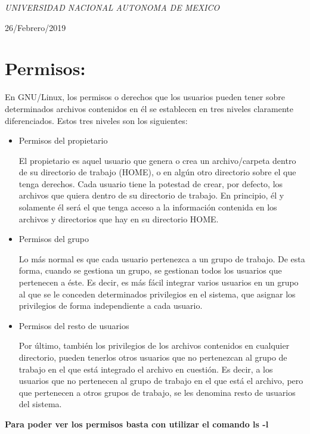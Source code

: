 \documentclass[a4paper, 11pt, oneside]{article}
\begin{document}
\begin{titlepage}
	\textit{UNIVERSIDAD NACIONAL AUTONOMA DE MEXICO} 
	
	\vfill
	
	
	
	
	\vspace{0.3\baselineskip} 
	
	26/Febrero/2019 

\end{titlepage}

\section*{Permisos:}

En GNU/Linux, los permisos o derechos que los usuarios pueden tener sobre determinados archivos contenidos en él se establecen en tres niveles claramente diferenciados. Estos tres niveles son los siguientes:
\begin{itemize}
    \item Permisos del propietario

El propietario es aquel usuario que genera o crea un archivo/carpeta dentro de su directorio de trabajo (HOME), o en algún otro directorio sobre el que tenga derechos. Cada usuario tiene la potestad de crear, por defecto, los archivos que quiera dentro de su directorio de trabajo. En principio, él y solamente él será el que tenga acceso a la información contenida en los archivos y directorios que hay en su directorio HOME.

\item Permisos del grupo

Lo más normal es que cada usuario pertenezca a un grupo de trabajo. De esta forma, cuando se gestiona un grupo, se gestionan todos los usuarios que pertenecen a éste. Es decir, es más fácil integrar varios usuarios en un grupo al que se le conceden determinados privilegios en el sistema, que asignar los privilegios de forma independiente a cada usuario.

\item Permisos del resto de usuarios

Por último, también los privilegios de los archivos contenidos en cualquier directorio, pueden tenerlos otros usuarios que no pertenezcan al grupo de trabajo en el que está integrado el archivo en cuestión. Es decir, a los usuarios que no pertenecen al grupo de trabajo en el que está el archivo, pero que pertenecen a otros grupos de trabajo, se les denomina resto de usuarios del sistema.

\end{itemize}
\textbf{Para poder ver los permisos basta con utilizar el comando ls -l}
\end{document}
